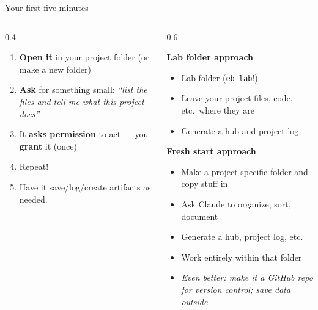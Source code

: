 \documentclass[aspectratio=169, 10pt]{beamer}
\begin{document}
\begin{frame}[fragile]{Your first five minutes}
\vskip2pt
\begin{columns}[T]
\begin{column}{0.4\textwidth}
\begin{tcolorbox}[keybox, title={\faPlay\quad Starting off}, top=3pt, bottom=3pt]
\small
\begin{enumerate}\setlength{\itemsep}{4pt}
  \item \textbf{Open it} in your project folder (or make a new folder)
  \item \textbf{Ask} for something small: \textit{``list the files and tell me what this project does''}
  \item It \textbf{asks permission} to act --- you \textbf{grant} it (once)
  \item Repeat!
  \item Have it save/log/create artifacts as needed.
\end{enumerate}
\end{tcolorbox}
\end{column}
\begin{column}{0.6\textwidth}
\begin{tcolorbox}[accentbox, top=2pt, bottom=2pt]
\small
\textbf{Lab folder approach}
\vskip2pt
\begin{itemize}\setlength{\itemsep}{1pt}
\item Lab folder (\texttt{eb-lab}!)
\item Leave your project files, code, etc.\ where they are
\item Generate a hub and project log
\end{itemize}
\end{tcolorbox}
\vskip3pt
\begin{tcolorbox}[accentbox, top=2pt, bottom=2pt]
\small
\textbf{Fresh start approach}
\vskip2pt
\begin{itemize}\setlength{\itemsep}{1pt}
\item Make a project-specific folder and copy stuff in
\item Ask Claude to organize, sort, document
\item Generate a hub, project log, etc.\
\item Work entirely within that folder
\item \textit{Even better: make it a GitHub repo for version control; save data outside}
\end{itemize}
\end{tcolorbox}
\end{column}
\end{columns}
\end{frame}
\end{document}
